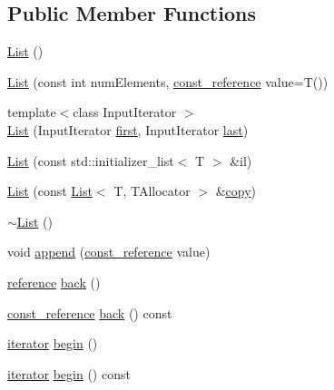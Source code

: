\subsection*{Public Member Functions}
\begin{DoxyCompactItemize}
\item 
\hyperlink{classprism_1_1_list_a3608d1ce797df492ee7d90a3c340515f}{List} ()
\item 
\hyperlink{classprism_1_1_list_ae1f2cec1b8d7fecec86297fee77e499a}{List} (const int num\+Elements, \hyperlink{classprism_1_1_list_aa263682b12cb5ca200c1b30f85fac524}{const\+\_\+reference} value=T())
\item 
{\footnotesize template$<$class Input\+Iterator $>$ }\\\hyperlink{classprism_1_1_list_ae663f8e68894b024ce46a5e8d2c56d90}{List} (Input\+Iterator \hyperlink{classprism_1_1_list_a403997c37906888fb96e612557fc7a05}{first}, Input\+Iterator \hyperlink{classprism_1_1_list_a674a1f2acb2580b63ec54964334721dd}{last})
\item 
\hyperlink{classprism_1_1_list_a7d6096b7c959368bf0e35162959464d0}{List} (const std\+::initializer\+\_\+list$<$ T $>$ \&il)
\item 
\hyperlink{classprism_1_1_list_a043cd0e81a37f8c23e08673939fe8f91}{List} (const \hyperlink{classprism_1_1_list}{List}$<$ T, T\+Allocator $>$ \&\hyperlink{namespaceprism_ae776f4cd825f79e7af1cf6ee1d90a209}{copy})
\item 
\hyperlink{classprism_1_1_list_a5b1a463b75d19bf6fa6416783f8be842}{$\sim$\+List} ()
\item 
void \hyperlink{classprism_1_1_list_a52a0d0ad9f3d7008affbb33c59788973}{append} (\hyperlink{classprism_1_1_list_aa263682b12cb5ca200c1b30f85fac524}{const\+\_\+reference} value)
\item 
\hyperlink{classprism_1_1_list_a87113fe9cf2580e395e3d9f2962f4e81}{reference} \hyperlink{classprism_1_1_list_a17253058099ff3db0ff1c59ab9aaa062}{back} ()
\item 
\hyperlink{classprism_1_1_list_aa263682b12cb5ca200c1b30f85fac524}{const\+\_\+reference} \hyperlink{classprism_1_1_list_aa3f4adb4b98aaea022b44fc46dcedc39}{back} () const 
\item 
\hyperlink{classprism_1_1_list_a32f6b5634a5aabc496ccb652eb22c490}{iterator} \hyperlink{classprism_1_1_list_af79b38b4f00cd52875c043a236d8d5d1}{begin} ()
\item 
\hyperlink{classprism_1_1_list_a32f6b5634a5aabc496ccb652eb22c490}{iterator} \hyperlink{classprism_1_1_list_ac1c717e7a1cd1ab2b30ba0701158dad4}{begin} () const 

\end{DoxyCompactItemize}
